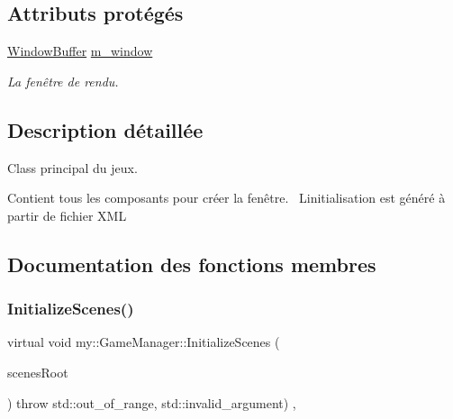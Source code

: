 \subsection*{Attributs protégés}
\begin{DoxyCompactItemize}
\item 
\mbox{\label{classmy_1_1GameManager_a94d72e7dc8cd242d169c709d49092838}} 
\hyperlink{structmy_1_1WindowBuffer}{Window\+Buffer} \hyperlink{classmy_1_1GameManager_a94d72e7dc8cd242d169c709d49092838}{m\+\_\+window}
\begin{DoxyCompactList}\small\item\em La fenêtre de rendu. \end{DoxyCompactList}\end{DoxyCompactItemize}


\subsection{Description détaillée}
Class principal du jeux. 

Contient tous les composants pour créer la fenêtre.~\newline
 L\textquotesingle{}initialisation est généré à partir de fichier X\+ML 

\subsection{Documentation des fonctions membres}
\mbox{\label{classmy_1_1GameManager_a4374c551a764c9cea7c0f0ee5e2871ea}} 
\subsubsection{\texorpdfstring{Initialize\+Scenes()}{InitializeScenes()}}
{\footnotesize\ttfamily virtual void my\+::\+Game\+Manager\+::\+Initialize\+Scenes (\begin{DoxyParamCaption}\item[{X\+M\+L\+Node\+::\+X\+M\+L\+Node\+Ptr}]{scenes\+Root }\end{DoxyParamCaption}) throw  std\+::out\+\_\+of\+\_\+range, std\+::invalid\+\_\+argument) \hspace{0.3cm}{\ttfamily [protected]}, {}}



